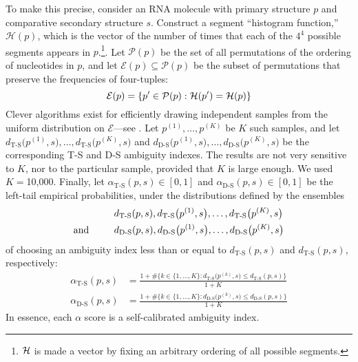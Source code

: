 \documentclass[10pt,letterpaper]{article}
\begin{document}
To make this precise, consider an RNA molecule with primary structure $p$ and comparative secondary structure $s$. Construct a segment ``histogram function,'' $\mathcal{H}(p)$, which is the 
vector of the number of times that each of the $4^4$ possible segments appears in $p$.\footnote{${\cal H}$ is made a vector by fixing an arbitrary ordering of all possible segments.}.
Let $\mathcal{P}(p)$ be the set of all permutations of the ordering of nucleotides in $p$, and let 
$\mathcal{E}(p)\subseteq\mathcal{P}(p)$ be the subset of permutations that preserve the frequencies of four-tuples:
\[
{\cal E}(p) = \{p'\in\mathcal{P}(p): {\cal H}(p')={\cal H}(p)\}
\]
Clever algorithms exist for efficiently drawing independent samples from the uniform distribution on $\mathcal{E}$---see \cite{Kandel1996-kz, Fitch1983-ec, Altschul1985-nq}. Let $p^{(1)},
\ldots,p^{(K)}$ be $K$ such samples, and let $\displaystyle
d_\text{T-S}\big(p^{(1)},s\big),\ldots,d_\text{T-S}\big(p^{(K)},s\big)$ and
$\displaystyle
d_\text{D-S}\big(p^{(1)},s\big),\ldots,d_\text{D-S}\big(p^{(K)},s\big)$ 
be the corresponding T-S and D-S ambiguity indexes. The results are not very sensitive to $K$, nor to the particular sample, provided that $K$ is large enough. We used $K=$10,000. Finally, let 
$\alpha_\text{T-S}(p,s) \in [0,1]$ and
$\alpha_\text{D-S}(p,s) \in [0,1]$
be the left-tail empirical probabilities, under the distributions defined by the ensembles
\begin{align}
&  d_\text{T-S}(p,s),d_\text{T-S}\big(p^{(1)},s\big),\ldots,d_\text{T-S}\big(p^{(K)},s\big) 
\label{eqn:T-Sensemble}\\
\text{and \hglue .8cm} 
& d_\text{D-S}(p,s),d_\text{D-S}\big(p^{(1)},s\big),\ldots,d_\text{D-S}\big(p^{(K)},s\big) 
\label{eqn:D-Sensemble}
\end{align}
of choosing an ambiguity index less than or equal to $d_\text{T-S}(p,s)$ and 
$d_\text{T-S}(p,s)$, respectively:
\begin{align}
\alpha_\text{T-S}(p,s)  & = \frac
{1 + \#\{k\in\{1,\ldots,K\}: d_\text{T-S}\big(p^{(k)},s\big) \leq d_\text{T-S}(p,s)\}}{1+K} \label{eqn:alpha_T-S} \\
\alpha_\text{D-S}(p,s)  & = \frac
{1 + \#\{k\in\{1,\ldots,K\}: d_\text{D-S}\big(p^{(k)},s\big)\leq d_\text{D-S}(p,s)\}}{1+K} \label{eqn:alpha_D-S}
\end{align}
In essence, each $\alpha$ score is a self-calibrated ambiguity index.
\end{document}
